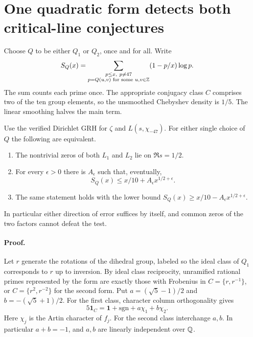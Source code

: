 \section{One quadratic form detects both critical-line conjectures}
\label{sec:prime}
Choose $Q$ to be either $Q_1$ or $Q_2$, once and for all. Write
\[
 S_Q(x)=\sum_{\substack{p\le x,\ p\ne47\\ p=Q(u,v)\text{ for some }u,v\in\mathbb Z}}
   (1-p/x)\log p .
\]
The sum counts each prime once. The appropriate conjugacy class $C$ comprises two of the ten group elements, so the unsmoothed Chebyshev density is $1/5$. The linear smoothing halves the main term.

\begin{theorem}\label{th:primes}
Use the verified Dirichlet GRH for $\zeta$ and $L(s,\chi_{-47})$. For either single choice of $Q$ the following are equivalent.
\begin{enumerate}
\item The nontrivial zeros of both $L_1$ and $L_2$ lie on $\Re s=1/2$.
\item For every $\epsilon>0$ there is $A_\epsilon$ such that, eventually,
\[
                 S_Q(x)\le x/10+A_\epsilon x^{1/2+\epsilon}.
\]
\item The same statement holds with the lower bound
$S_Q(x)\ge x/10-A_\epsilon x^{1/2+\epsilon}$.
\end{enumerate}
In particular either direction of error suffices by itself, and common zeros of the two factors cannot defeat the test.
\end{theorem}

\paragraph{Proof.}
Let $r$ generate the rotations of the dihedral group, labeled so the ideal class of $Q_1$ corresponds to $r$ up to inversion. By ideal class reciprocity, unramified rational primes represented by the form are exactly those with Frobenius in $C=\{r,r^{-1}\}$, or $C=\{r^2,r^{-2}\}$ for the second form. Put $a=(\sqrt5-1)/2$ and $b=-(\sqrt5+1)/2$. For the first class, character column orthogonality gives
\[
 5\mathbf{1}_C=\mathbf 1+\mathrm{sgn}+a\chi_1+b\chi_2 .
\]
Here $\chi_j$ is the Artin character of $f_j$. For the second class interchange $a,b$. In particular $a+b=-1$, and $a,b$ are linearly independent over $\mathbb Q$.

